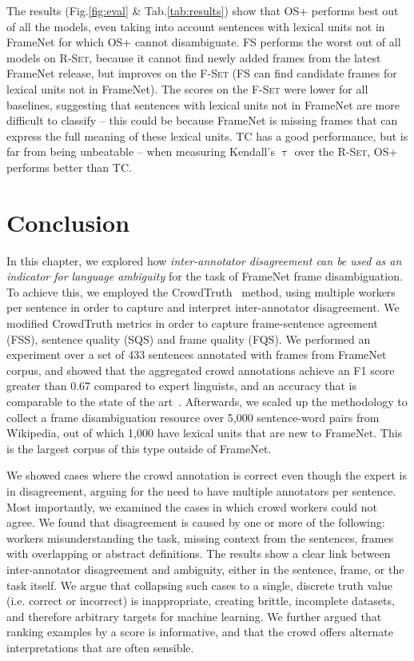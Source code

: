 The results (Fig.\ref{fig:eval} \& Tab.\ref{tab:results}) show that OS+ performs best out of all the models, even taking into account sentences with lexical units not in FrameNet for which OS+ cannot disambiguate. FS performs the worst out of all models on \textsc{R-Set}, because it cannot find newly added frames from the latest FrameNet release, but improves on the \textsc{F-Set} (FS can find candidate frames for lexical units not in FrameNet). The scores on the \textsc{F-Set} were lower for all baselines, suggesting that sentences with lexical units not in FrameNet are more difficult to classify -- this could be because FrameNet is missing frames that can express the full meaning of these lexical units. TC has a good performance, but is far from being unbeatable -- when measuring Kendall's $\uptau$ over the \textsc{R-Set}, OS+ performs better than TC.



\section{Conclusion}

In this chapter, we explored how \emph{inter-annotator disagreement can be used as an indicator for language ambiguity} for the task of FrameNet frame disambiguation. To achieve this, we employed the CrowdTruth~\cite{aroyo2014threesides} method, using multiple workers per sentence in order to capture and interpret inter-annotator disagreement. We modified CrowdTruth metrics in order to capture frame-sentence agreement (FSS), sentence quality (SQS) and frame quality (FQS). We performed an experiment over a set of 433 sentences annotated with frames from FrameNet corpus, and showed that the aggregated crowd annotations achieve an F1 score greater than 0.67 compared to expert linguists, and an accuracy that is comparable to the state of the art~\cite{Hong:2011:GCR:2018966.2018970}. Afterwards, we scaled up the methodology to collect a frame disambiguation resource over 5,000 sentence-word pairs from Wikipedia, out of which 1,000 have lexical units that are new to FrameNet. This is the largest corpus of this type outside of FrameNet.

We showed cases where the crowd annotation is correct even though the expert is in disagreement, arguing for the need to have multiple annotators per sentence. Most importantly, we examined the cases in which crowd workers could not agree. We found that disagreement is caused by one or more of the following: workers misunderstanding the task, missing context from the sentences, frames with overlapping or abstract definitions. The results show a clear link between inter-annotator disagreement and ambiguity, either in the sentence, frame, or the task itself. We argue that collapsing such cases to a single, discrete truth value (i.e. correct or incorrect) is inappropriate, creating brittle, incomplete datasets, and therefore arbitrary targets for machine learning.  We further argued that ranking examples by a score is informative, and that the crowd offers alternate interpretations that are often sensible.

